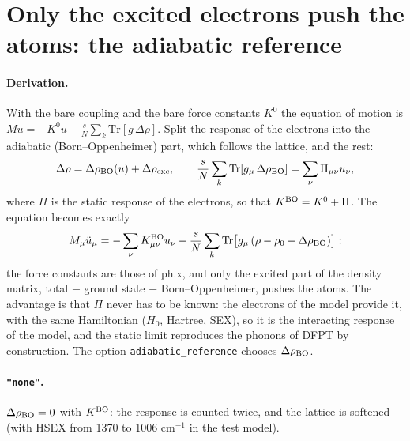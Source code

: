 \documentclass[11pt]{article}
\newcommand{\Dr}{\Delta\rho}
\begin{document}
\section{Only the excited electrons push the atoms: the adiabatic reference}\label{sec:adiabatic}
\paragraph{Derivation.} With the bare coupling and the bare force constants $K^0$ the equation of motion is
$M\ddot u = -K^0u - \frac sN\sum_k\mathrm{Tr}[g\,\Dr]$. Split the response of the electrons into the adiabatic
(Born--Oppenheimer) part, which follows the lattice, and the rest:
\begin{equation}
\Dr = \Dr_{\rm BO}(u) + \Dr_{\rm exc},\qquad \frac sN\sum_k\mathrm{Tr}[g_\mu\,\Dr_{\rm BO}] = \sum_\nu\Pi_{\mu\nu}u_\nu ,
\end{equation}
where $\Pi$ is the static response of the electrons, so that $K^{\rm BO} = K^0 + \Pi$. The equation becomes exactly
\begin{equation}
M_\mu\ddot u_\mu = -\sum_\nu K^{\rm BO}_{\mu\nu}u_\nu - \frac sN\sum_k\mathrm{Tr}\big[g_\mu\,(\rho-\rho_0-\Dr_{\rm BO})\big]:
\end{equation}
the force constants are those of ph.x, and only the excited part of the density matrix,
total $-$ ground state $-$ Born--Oppenheimer, pushes the atoms. The advantage is that $\Pi$ never has to be known:
the electrons of the model provide it, with the same Hamiltonian ($H_0$, Hartree, SEX), so it is the interacting response
of the model, and the static limit reproduces the phonons of DFPT by construction. The option
\texttt{adiabatic\_reference} chooses $\Dr_{\rm BO}$.

\paragraph{\texttt{"none"}.} $\Dr_{\rm BO}=0$ with $K^{\rm BO}$: the response is counted twice, and the
lattice is softened (with HSEX from 1370 to 1006 cm$^{-1}$ in the test model).
\end{document}
